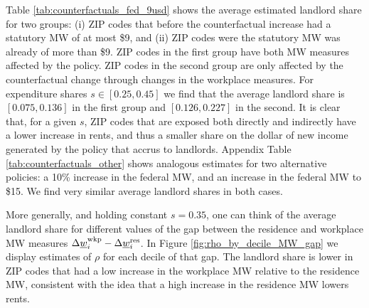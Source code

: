 Table \ref{tab:counterfactuals_fed_9usd} shows the average estimated landlord 
share for two groups: 
(i) ZIP codes that before the counterfactual increase had a statutory MW of 
at most \$9, and 
(ii) ZIP codes were the statutory MW was already of more than \$9.
ZIP codes in the first group have both MW measures affected by the policy.
ZIP codes in the second group are only affected by the counterfactual change 
through changes in the workplace measures.
For expenditure shares $s\in[0.25, 0.45]$ we find that the average landlord
share is $[0.075, 0.136]$ in the first group and $[0.126, 0.227]$ in the 
second.
It is clear that, for a given $s$, ZIP codes that are exposed both directly
and indirectly have a lower increase in rents, and thus a smaller share
on the dollar of new income generated by the policy that accrus to landlords.
Appendix Table \ref{tab:counterfactuals_other} shows analogous estimates for
two alternative policies: a 10\% increase in the federal MW, and an increase
in the federal MW to \$15.
We find very similar average landlord shares in both cases.

More generally, and holding constant $s=0.35$, one can think of the average 
landlord share for different values of the gap between the residence and 
workplace MW measures 
$\Delta \underline{w}_i^{\text{wkp}} - \Delta \underline{w}_i^{\text{res}}$.
In Figure \ref{fig:rho_by_decile_MW_gap} we display estimates of $\rho$ for 
each decile of that gap.
The landlord share is lower in ZIP codes that had a low increase in the 
workplace MW relative to the residence MW, consistent with the idea
that a high increase in the residence MW lowers rents.
